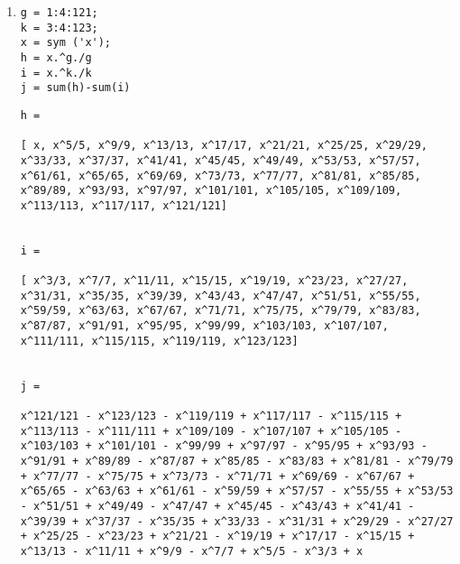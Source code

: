 \documentclass[aps,pre,nofootinbib]{revtex4}
\begin{document}
\begin{enumerate}
\begin{enumerate}
The string for adjusting marker size is `markerSize,' and the size is determined in `points.' Points are the default data points in Matlab.

\item

   \begin{verbatim}
[x, y] = meshgrid (-2.1:.15:2.1, -6:.15:6);
u = 80 * y.^2 .* exp(-x.^2 - 0.3*y.^2);
mesh (u)
\end{verbatim}

\texttt{[image: doublehorn]}

\item
n = 0:2000;
polar (pi*137.51*n/180,sqrt(n),'o')

\texttt{[image: sunflower]}

\end{enumerate}

\item

  \begin{verbatim}
g = 1:4:121;
k = 3:4:123;
x = sym ('x');
h = x.^g./g
i = x.^k./k
j = sum(h)-sum(i)

\end{verbatim}
       \color{lightgray} \begin{verbatim}
h =

[ x, x^5/5, x^9/9, x^13/13, x^17/17, x^21/21, x^25/25, x^29/29, x^33/33, x^37/37, x^41/41, x^45/45, x^49/49, x^53/53, x^57/57, x^61/61, x^65/65, x^69/69, x^73/73, x^77/77, x^81/81, x^85/85, x^89/89, x^93/93, x^97/97, x^101/101, x^105/105, x^109/109, x^113/113, x^117/117, x^121/121]


i =

[ x^3/3, x^7/7, x^11/11, x^15/15, x^19/19, x^23/23, x^27/27, x^31/31, x^35/35, x^39/39, x^43/43, x^47/47, x^51/51, x^55/55, x^59/59, x^63/63, x^67/67, x^71/71, x^75/75, x^79/79, x^83/83, x^87/87, x^91/91, x^95/95, x^99/99, x^103/103, x^107/107, x^111/111, x^115/115, x^119/119, x^123/123]


j =

x^121/121 - x^123/123 - x^119/119 + x^117/117 - x^115/115 + x^113/113 - x^111/111 + x^109/109 - x^107/107 + x^105/105 - x^103/103 + x^101/101 - x^99/99 + x^97/97 - x^95/95 + x^93/93 - x^91/91 + x^89/89 - x^87/87 + x^85/85 - x^83/83 + x^81/81 - x^79/79 + x^77/77 - x^75/75 + x^73/73 - x^71/71 + x^69/69 - x^67/67 + x^65/65 - x^63/63 + x^61/61 - x^59/59 + x^57/57 - x^55/55 + x^53/53 - x^51/51 + x^49/49 - x^47/47 + x^45/45 - x^43/43 + x^41/41 - x^39/39 + x^37/37 - x^35/35 + x^33/33 - x^31/31 + x^29/29 - x^27/27 + x^25/25 - x^23/23 + x^21/21 - x^19/19 + x^17/17 - x^15/15 + x^13/13 - x^11/11 + x^9/9 - x^7/7 + x^5/5 - x^3/3 + x


\end{verbatim}
\end{enumerate}
\end{document}
